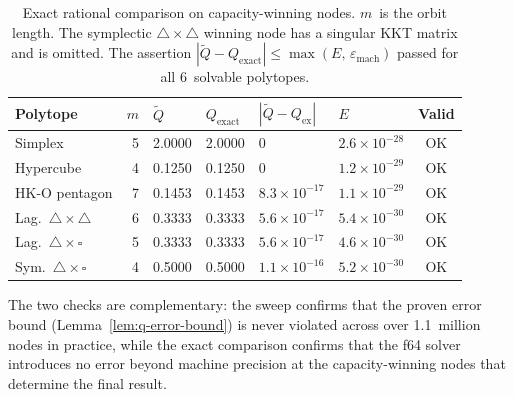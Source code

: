\begin{table}[h]
\centering
\small
\begin{tabular}{lrllllc}
\toprule
Polytope & $m$ & $\tilde{Q}$ & $Q_{\mathrm{exact}}$ & $|\tilde{Q} - Q_{\mathrm{ex}}|$ & $E$ & Valid \\
\midrule
Simplex              & 5 & 2.0000 & 2.0000 & $0$                & $2.6\times10^{-28}$ & OK \\
Hypercube            & 4 & 0.1250 & 0.1250 & $0$                & $1.2\times10^{-29}$ & OK \\
HK-O pentagon        & 7 & 0.1453 & 0.1453 & $8.3\times10^{-17}$ & $1.1\times10^{-29}$ & OK \\
Lag.\ $\triangle{\times}\triangle$ & 6 & 0.3333 & 0.3333 & $5.6\times10^{-17}$ & $5.4\times10^{-30}$ & OK \\
Lag.\ $\triangle{\times}\square$   & 5 & 0.3333 & 0.3333 & $5.6\times10^{-17}$ & $4.6\times10^{-30}$ & OK \\
Sym.\ $\triangle{\times}\square$   & 4 & 0.5000 & 0.5000 & $1.1\times10^{-16}$ & $5.2\times10^{-30}$ & OK \\
\bottomrule
\end{tabular}
\caption{Exact rational comparison on capacity-winning nodes.
  $m$~is the orbit length.
  The symplectic $\triangle{\times}\triangle$ winning node has a
  singular KKT matrix and is omitted.
  The assertion $|\tilde{Q} - Q_{\mathrm{exact}}| \le \max(E,\, \varepsilon_{\mathrm{mach}})$
  passed for all 6~solvable polytopes.}
\label{tab:q-error-exact}
\end{table}

The two checks are complementary: the sweep confirms that the
proven error bound (Lemma~\ref{lem:q-error-bound}) is never violated
across over 1.1~million nodes in practice, while the exact comparison
confirms that the f64 solver introduces no error beyond machine
precision at the capacity-winning nodes that determine the final result.

